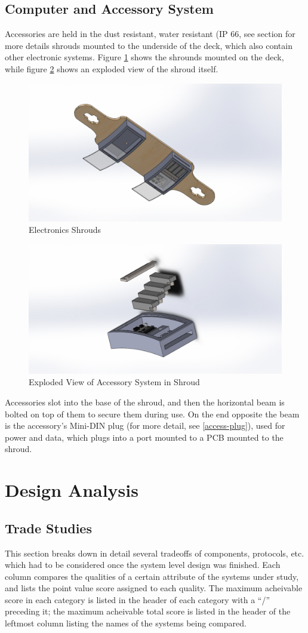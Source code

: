 \documentclass[letterpaper,12pt]{article}
\begin{document}
\subsection{Computer and Accessory System}
Accessories are held in the dust resistant, water resistant (IP 66, see section for more details shrouds mounted to the underside of the deck, which also contain other electronic systems. Figure \ref{access-full} shows the shrounds mounted on the deck, while figure \ref{access-expl} shows an exploded view of the shroud itself.
\begin{figure}\centering
  \includegraphics[width=.7\linewidth]{ModularAssembledBottomAngle}
  \caption{Electronics Shrouds}
  \label{access-full}
\end{figure}
\begin{figure}\centering
  \includegraphics[width=.7\linewidth]{ModPieceAngleExtend}
  \caption{Exploded View of Accessory System in Shroud}
  \label{access-expl}
\end{figure}
Accessories slot into the base of the shroud, and then the horizontal beam is bolted on top of them to secure them during use. On the end opposite the beam is the accessory's Mini-DIN plug (for more detail, see \ref{access-plug}), used for power and data, which plugs into a port mounted to a PCB mounted to the shroud.

\section{Design Analysis}
\subsection{Trade Studies}
This section breaks down in detail several tradeoffs of components, protocols, etc. which had to be considered once the system level design was finished. Each column compares the qualities of a certain attribute of the systems under study, and lists the point value score assigned to each quality. The maximum acheivable score in each category is listed in the header of each category with a ``/'' preceding it; the maximum acheivable total score is listed in the header of the leftmost column listing the names of the systems being compared.
\end{document}
